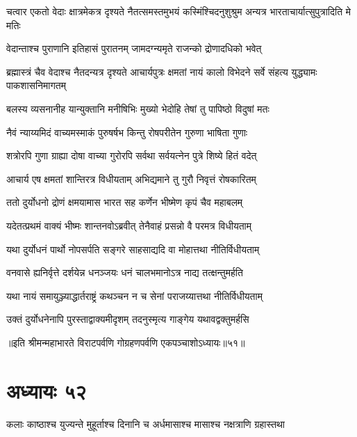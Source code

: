 \threelineshloka
{चत्वार एकतो वेदाः क्षात्रमेकत्र दृश्यते}
{नैतत्समस्तमुभयं कस्मिंश्चिदनुशुश्रुम}
{अन्यत्र भारताचार्यात्सुपुत्रादिति मे मतिः}


\twolineshloka
{वेदान्ताश्च पुराणानि इतिहासं पुरातनम्}
{जामदग्न्यमृते राजन्को द्रोणादधिको भवेत्}


\onelineshloka
{ब्रह्मास्त्रं चैव वेदाश्च नैतदन्यत्र दृश्यते}
\twolineshloka
{आचार्यपुत्रः क्षमतां नायं कालो विभेदने}
{सर्वे संहत्य युद्ध्यामः पाकशासनिमागतम्}


\twolineshloka
{बलस्य व्यसनानीह यान्युक्तानि मनीषिभिः}
{मुख्यो भेदोहि तेषां तु पापिष्ठो विदुषां मतः}




\twolineshloka
{नैवं न्याय्यमिदं वाच्यमस्माकं पुरुषर्षभ}
{किन्तु रोषपरीतेन गुरुणा भाषिता गुणाः}


\twolineshloka
{शत्रोरपि गुणा ग्राह्या दोषा वाच्या गुरोरपि}
{सर्वथा सर्वयत्नेन पुत्रे शिष्ये हितं वदेत्}


\twolineshloka
{आचार्य एष क्षमतां शान्तिरत्र विधीयताम्}
{अभिद्यमाने तु गुरौ निवृत्तं रोषकारितम्}



\twolineshloka
{ततो दुर्योधनो द्रोणं क्षमयामास भारत}
{सह कर्णेन भीष्मेण कृपं चैव महाबलम्}




\twolineshloka
{यदेतत्प्रथमं वाक्यं भीष्मः शान्तनवोऽब्रवीत्}
{तेनैवाहं प्रसन्नो वै परमत्र विधीयताम्}


\twolineshloka
{यथा दुर्योधनं पार्थो नोपसर्पति सङ्गरे}
{साहसाद्यदि वा मोहात्तथा नीतिर्विधीयताम्}


\twolineshloka
{वनवासे ह्यनिर्वृत्ते दर्शयेन्न धनञ्जयः}
{धनं चालभमानोऽत्र नाद्य तत्क्षन्तुमर्हति}


\twolineshloka
{यथा नायं समायुञ्ज्याद्धार्तराष्ट्रं कथञ्चन}
{न च सेनां पराजय्यात्तथा नीतिर्विधीयताम्}


\twolineshloka
{उक्तं दुर्योधनेनापि पुरस्ताद्वाक्यमीदृशम्}
{तदनुस्मृत्य गाङ्गेय यथावद्वक्तुमर्हसि}

॥इति श्रीमन्महाभारते विराटपर्वणि गोग्रहणपर्वणि एकपञ्चाशोऽध्यायः॥५१॥

\chapter{अध्यायः ५२}

\twolineshloka
{कलाः काष्ठाश्च युज्यन्ते मुहूर्ताश्च दिनानि च}
{अर्धमासाश्च मासाश्च नक्षत्राणि ग्रहास्तथा}



